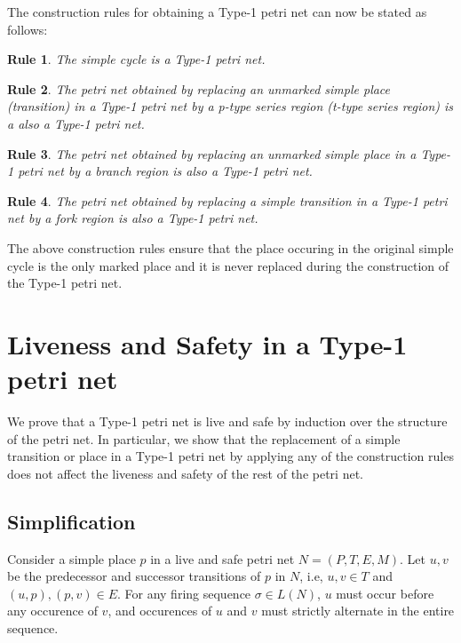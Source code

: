 \documentclass[12pt,a4paper]{article}
\newtheorem{srule}{Rule}
\begin{document}
The construction rules for obtaining a  Type-1 petri net can now be
stated as follows:

\setcounter{srule}{-1}

\begin{srule}
  The simple cycle is a Type-1 petri net.
\end{srule}

\begin{srule}
  The petri net obtained by replacing an unmarked simple place
  (transition) in a Type-1 petri net by a p-type series region (t-type
  series region) is a also a Type-1 petri net.
\end{srule}

\begin{srule}
  The petri net obtained by replacing an unmarked simple place in a
  Type-1 petri net by a branch region is also a Type-1 petri net.
\end{srule}

\begin{srule}
  The petri net obtained by replacing a simple transition in a Type-1
  petri net by a fork region is also a Type-1 petri net.
\end{srule}

The above construction rules ensure that the place occuring in the
original simple cycle is the only marked place and it is never
replaced during the construction of the Type-1 petri net.

\section{Liveness and Safety in a Type-1 petri net}
\label{sec:live-safe}

We prove that a Type-1 petri net is live and safe by induction over
the structure of the petri net. In particular, we show that the
replacement of a simple transition or place in a Type-1 petri net by
applying any of the construction rules does not affect the liveness
and safety of the rest of the petri net.

\subsection{Simplification}
\label{sec:simplification-live-safe}

Consider a simple place $p$ in a live and safe petri net $N =
(P,T,E,M)$. Let $u,v$ be the predecessor and successor transitions of
$p$ in $N$, i.e, $u,v \in T$ and $(u,p), (p,v)\in E$. For any firing
sequence $\sigma \in L(N)$, $u$ must occur before any occurence of
$v$, and occurences of $u$ and $v$ must strictly alternate in the
entire sequence.
\end{document}
